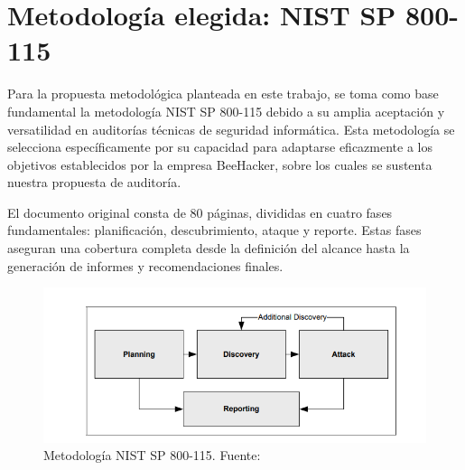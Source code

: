 \documentclass[a4paper, 11pt]{article}
\begin{document}
\par\vspace{0.5cm}




\clearpage

\thispagestyle{nohead}






\section{Metodología elegida: NIST SP 800-115}

\par\vspace{0.5cm}

Para la propuesta metodológica planteada en este trabajo, se toma como base fundamental la metodología NIST SP 800-115 debido a su amplia aceptación y versatilidad en auditorías técnicas de seguridad informática. Esta metodología se selecciona específicamente por su capacidad para adaptarse eficazmente a los objetivos establecidos por la empresa BeeHacker, sobre los cuales se sustenta nuestra propuesta de auditoría. 
\par\vspace{0.5cm}


El documento original consta de 80 páginas, divididas en cuatro fases fundamentales: planificación, descubrimiento, ataque y reporte. Estas fases aseguran una cobertura completa desde la definición del alcance hasta la generación de informes y recomendaciones finales. \cite{nist800115} 


\begin{figure}[H]
    \centering
    \includegraphics[width=13cm]{images/nist_800115.png}
    \caption{Metodología NIST SP 800-115. Fuente: \cite{nist800115}}
    \label{fig:nist_800115}
\end{figure}
\end{document}

